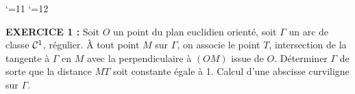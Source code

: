 \documentclass{article}
\begin{document}
\def\boxit#1#2{\setbox1=\hbox{\kern#1{#2}\kern#1}%
\dimen1=\ht1 \advance\dimen1 by #1 \dimen2=\dp1 \advance\dimen2 by #1
\setbox1=\hbox{\vrule height\dimen1 depth\dimen2\box1\vrule}%
\setbox1=\vbox{\hrule\box1\hrule}%
\advance\dimen1 by .4pt \ht1=\dimen1
\advance\dimen2 by .4pt \dp1=\dimen2 \box1\relax}


\catcode`\@=11
\def\system#1{\left\{\null\,\vcenter{\openup1\jot\m@th
\ialign{\strut\hfil$##$&$##$\hfil&&\enspace$##$\enspace&
\hfil$##$&$##$\hfil\crcr#1\crcr}}\right.}
\catcode`\@=12
\pagestyle{empty}
\def\lap#1{{\cal L}[#1]}
\def\DP#1#2{{\partial#1\s\partial#2}}
\def\cala{{\cal A}}
\def\fhat{\widehat{f}}
\let\wh=\widehat
\def\ftilde{\tilde{f}}











\def\lap#1{{\cal L}[#1]}
\def\DP#1#2{{\partial#1\s\partial#2}}



\overfullrule=0mm


\msk
{}\msk
{}\msk
\bsk

{\bf EXERCICE 1 :}\msk
Soit $O$ un point du plan euclidien orient\'e, soit $\Gamma$ un arc de classe ${\cal C}^1$, r\'egulier. \`A tout point $M$ sur $\Gamma$, on associe le point $T$, intersection de la tangente \`a $\Gamma$ en $M$ avec la perpendiculaire \`a $(OM)$ issue de $O$.\msk
D\'eterminer $\Gamma$ de sorte que la distance $MT$ soit constante \'egale \`a 1. Calcul d'une abscisse curviligne sur $\Gamma$.


\msk
\cl{- - - - - - - - - - - - - - - - - - - - - - - - - - - - - - - }
\msk
\end{document}
